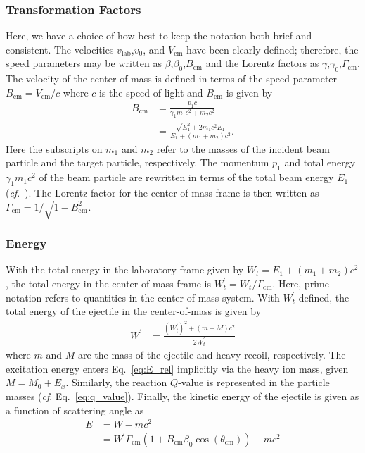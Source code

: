 \subsubsection{Transformation Factors}
Here, we have a choice of how best to keep the notation both brief and consistent.  The velocities $v_\mathrm{lab}$,$v_0$, and $V_\mathrm{cm}$ have been clearly defined; %
 therefore, the speed parameters may be written as $\beta$,$\beta_0$,$B_\mathrm{cm}$ and the Lorentz factors as $\gamma$,$\gamma_0$,$\Gamma_\mathrm{cm}$. 	
The velocity of the center-of-mass is defined in terms of the speed parameter $B_\mathrm{cm}=V_\mathrm{cm}/c$ where $c$ is the speed of light and $B_\mathrm{cm}$ is given by 
\begin{equation}
\begin{split}
B_\mathrm{cm}%
&=\frac{p_1c}{\gamma_1 m_1c^2+m_2c^2}\\
&=\frac{\sqrt{E_1^2+2m_1c^2E_1}}{E_1+(m_1+m_2)c^2}.
\end{split}
\label{big_beta}
\end{equation}
Here the subscripts on $m_1$ and $m_2$ refer to the masses of the incident beam particle and the target particle, respectively.  The momentum $p_1$ and total energy $\gamma_1 m_1c^2$ of the beam particle are rewritten in terms of the total beam energy $E_1$ (\textit{cf}.~\citet[Eq.~7.98]{Goldstein_2002}).  The Lorentz factor for the center-of-mass frame is then written as $\Gamma_\mathrm{cm}=1/\sqrt{1-B_\mathrm{cm}^2}$.

\subsubsection{Energy}
With the total energy in the laboratory frame given by $W_t=E_1+(m_1+m_2)c^2$, the total energy in the center-of-mass frame is $W_t^\prime=W_t/\Gamma_\mathrm{cm}$.  Here, prime notation refers to quantities in the center-of-mass system.  With $W_t^\prime$ defined, the total energy of the ejectile in the center-of-mass is given by 
\begin{equation}
\begin{split}
W^\prime&=\frac{(W_t^\prime)^2+(m-M)c^2}{2W_t^\prime}
\end{split}
\label{eq:E_rel}
\end{equation}
where $m$ and $M$ are the mass of the ejectile and heavy recoil, respectively.  The excitation energy enters Eq.~\ref{eq:E_rel} implicitly via the heavy ion mass, given $M=M_0+E_x$.  Similarly, the reaction $Q$-value is represented in the particle masses (\textit{cf}. Eq.~\ref{eq:q_value}). Finally, the kinetic energy of the ejectile is given as a function of scattering angle as 
\begin{equation}
\begin{split}
E&=W-mc^2\\
&=W^\prime \Gamma_\mathrm{cm}(1+ B_\mathrm{cm} \beta_0 \cos(\theta_\mathrm{cm}))-mc^2
\end{split}
\label{eq:E_rel2}
\end{equation}

